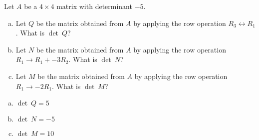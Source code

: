 
\begin{exerciseStatement}


Let \(A\) be a \(4 \times 4\) matrix with determinant \( -5 \).


\begin{enumerate}[(a)]
\item Let \(Q\) be the matrix obtained from \(A\) by applying the row operation \( R_3 \leftrightarrow R_1 \). What is \(\operatorname{det}\ Q\)?
\item Let \(N\) be the matrix obtained from \(A\) by applying the row operation \( R_1 \to R_1 + -3R_2 \). What is \(\operatorname{det}\ N\)?
\item Let \(M\) be the matrix obtained from \(A\) by applying the row operation \( R_1 \to -2R_1 \). What is \(\operatorname{det}\ M\)?
\end{enumerate}
    
\end{exerciseStatement}
    
\begin{exerciseAnswer} 

\begin{enumerate}[(a)]
\item \(\operatorname{det}\ Q= 5 \)
\item \(\operatorname{det}\ N= -5 \)
\item \(\operatorname{det}\ M= 10 \)
\end{enumerate}
    
\end{exerciseAnswer}
    
